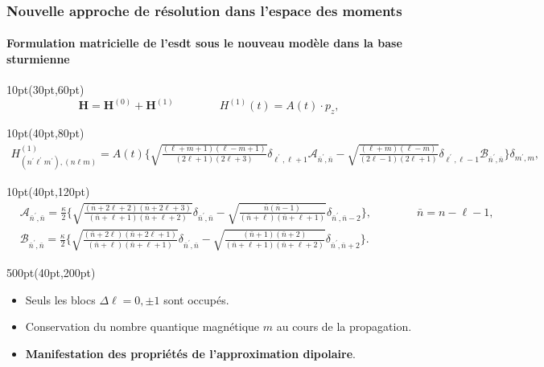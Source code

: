 \begin{frame}
 \frametitle{Nouvelle approche de r\'esolution dans l'espace des moments}
 \framesubtitle{Formulation matricielle de l'\acrshort{esdt} 
sous le nouveau mod\`ele dans la base sturmienne}

\begin{textblock*}{10pt}(30pt,60pt)
\footnotesize
\begin{equation*}
\mathbf{H} = \mathbf{H}^{(0)} + \mathbf{H}^{(1)}
\qquad\qquad  H^{(1)} (t) = {A}(t)\cdot p_z,
\end{equation*}
\end{textblock*}

\begin{textblock*}{10pt}(40pt,80pt)
\footnotesize
\begin{equation*}
 \begin{split}
   H^{(1)}_{(n^\prime\ell^\prime m^\prime),(n\ell m)} 
  = A(t) \Bigg\lbrace
    \sqrt{\frac{(\ell+m+1)(\ell-m+1)}{(2\ell+1)(2\ell+3)}}
  \delta_{\ell^\prime,\ell+1}  \mathcal{A}_{\bar n^\prime,\bar n} 
  - \sqrt{\frac{(\ell+m)(\ell-m)}{(2\ell-1)(2\ell+1)}}
   \delta_{\ell^\prime,\ell-1} \mathcal{B}_{\bar n^\prime,\bar n}
  \Bigg\rbrace \delta_{m^\prime,m},
 \end{split}
\end{equation*}
\end{textblock*}

\begin{textblock*}{10pt}(40pt,120pt)
\footnotesize
\begin{align*}
& \mathcal{A}_{\bar n^\prime, \bar n}
 = \frac{\kappa}{2} \Bigg\lbrace
 \sqrt{\frac{(\bar n +2\ell+2)(\bar n+2\ell+3)}{(\bar n +\ell+1)(\bar n+\ell+2)}}\delta_{\bar n^\prime,\bar n}
 - \sqrt{\frac{\bar n(\bar n-1)}{(\bar n +\ell)(\bar n+\ell+1)}}\delta_{\bar n^\prime,\bar n-2} \Bigg\rbrace, \qquad\qquad \bar{n}=n-\ell-1, \\  
& \mathcal{B}_{\bar n^\prime, \bar n}
  = \frac{\kappa}{2} \Bigg\lbrace
 \sqrt{\frac{(\bar n +2\ell)(\bar n+2\ell+1)}{(\bar n +\ell)(\bar n+\ell+1)}}\delta_{\bar n^\prime,\bar n}
 - \sqrt{\frac{(\bar n+1)(\bar n+2)}{(\bar n +\ell+1)(\bar n+\ell+2)}}\delta_{\bar n^\prime,\bar n+2} \Bigg\rbrace. 
\end{align*}
\end{textblock*}


\begin{textblock*}{500pt}(40pt,200pt)
\footnotesize
\begin{itemize}
 \item Seuls les blocs $\Delta\ell=0,\pm 1$ sont occup\'es.
 \item Conservation du nombre quantique magn\'etique $m$ au cours de  
la propagation.
 \item \textbf{Manifestation des propri\'et\'es de l'approximation dipolaire}.
\end{itemize}
\end{textblock*}

\end{frame}

